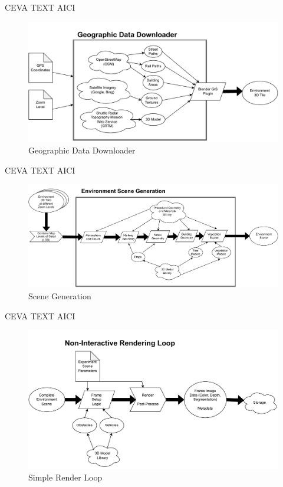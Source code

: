CEVA TEXT AICI

\begin{figure}[H]
    \centering
    \includegraphics[width=14.5cm]{src/img/fig/fig-2 Geographic Data Downloader.drawio.pdf}
    \caption{Geographic Data Downloader}
    \label{fig:design-data-downloader}
\end{figure}


CEVA TEXT AICI

\begin{figure}[H]
    \centering
    \includegraphics[width=14.5cm]{src/img/fig/fig-3 environment scene generation.drawio.pdf}
    \caption{Scene Generation}
    \label{fig:design-scene-generation}
\end{figure}

CEVA TEXT AICI

\begin{figure}[H]
    \centering
    \includegraphics[width=14.5cm]{src/img/fig/fig-4 non-interactive render loop.drawio.pdf}
    \caption{Simple Render Loop}
    \label{fig:design-render-non-interactive}
\end{figure}



